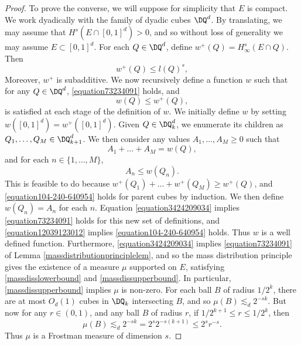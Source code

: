 \begin{proof}
	To prove the converse, we will suppose for simplicity that $E$ is compact. We work dyadically with the family of dyadic cubes $\DQ^d$.  By translating, we may assume that $H^s(E \cap [0,1]^d) > 0$, and so without loss of generality we may assume $E \subset [0,1]^d$. For each $Q \in \DQ^d$, define $w^+(Q) = H^s_\infty(E \cap Q)$. Then
	\begin{equation} \label{equation7099014901209} w^+(Q) \leq l(Q)^s, \end{equation}
	Moreover, $w^+$ is subadditive. We now recursively define a function $w$ such that for any $Q \in \DQ^d$, \eqref{equation73234091} holds, and
	\begin{equation} \label{equation104-240-640954} w(Q) \leq w^+(Q), \end{equation}
	is satisfied at each stage of the definition of $w$. We initially define $w$ by setting $w([0,1]^d) = w^+([0,1]^d)$. Given $Q \in \DQ_k^d$, we enumerate its children as $Q_1, \dots, Q_M \in \DQ_{k+1}^d$. We then consider any values $A_1, \dots, A_M \geq 0$ such that
  	\begin{equation} \label{equation3424209034}
  		A_1 + \dots + A_M = w(Q),
  	\end{equation}
  	and for each $n \in \{ 1, \dots, M \}$,
  	\begin{equation} \label{equation12039123012}
  		A_n \leq w(Q_n).
  	\end{equation}
	This is feasible to do because $w^+(Q_1) + \dots + w^+(Q_M) \geq w^+(Q)$, and \eqref{equation104-240-640954} holds for parent cubes by induction. We then define $w(Q_n) = A_n$ for each $n$. Equation \eqref{equation3424209034} implies \eqref{equation73234091} holds for this new set of definitions, and \eqref{equation12039123012} implies \eqref{equation104-240-640954} holds. Thus $w$ is a well defined function. Furthermore, \eqref{equation3424209034} implies \eqref{equation73234091} of Lemma \ref{massdistributionprinciplelem}, and so the mass distribution principle gives the existence of a measure $\mu$ supported on $E$, satisfying \eqref{massdisslowerbound} and \eqref{massdissupperbound}. In particular, \eqref{massdissupperbound} implies $\mu$ is non-zero. For each ball $B$ of radius $1/2^k$, there are at most $O_d(1)$ cubes in $\DQ_k$ intersecting $B$, and so $\mu(B) \lesssim_d 2^{-sk}$. But now for any $r \in (0,1)$, and any ball $B$ of radius $r$, if $1/2^{k+1} \leq r \leq 1/2^k$, then
	\[ \mu(B) \lesssim_d 2^{-sk} = 2^s 2^{-s(k+1)} \leq 2^s r^{-s}. \]
	Thus $\mu$ is a Frostman measure of dimension $s$.
\end{proof}


